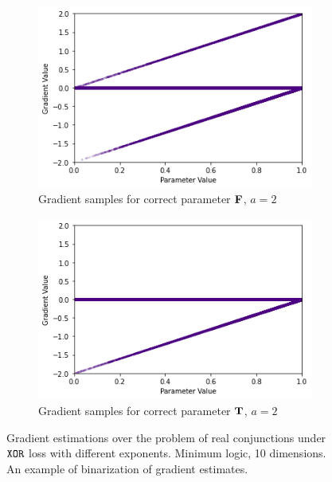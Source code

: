 \begin{figure}[ht]
\begin{subfigure}[b]{0.47\textwidth}
        \includegraphics[width=\textwidth]{imgs/grad_min_2_falseparam.png}
        \caption{Gradient samples for correct parameter $\textbf{F}$, $a=2$}
        \label{fig:conjgrad10falseavgm}
    \end{subfigure}
    \begin{subfigure}[b]{0.47\textwidth}
        \centering
        \includegraphics[width=\textwidth]{imgs/grad_min_2_trueparam.png}
        \caption{Gradient samples for correct parameter $\textbf{T}$, $a=2$}
        \label{fig:conjgrad10trueavgm}
    \end{subfigure}
       \caption{Gradient estimations over the problem of real conjunctions under $\texttt{XOR}$ loss with different exponents. Minimum logic, 10 dimensions. An example of binarization of gradient estimates.}
       \label{fig:conjgrad10m}
\end{figure}

